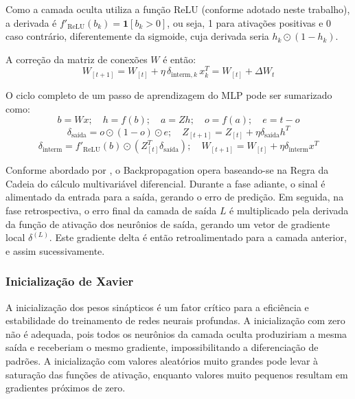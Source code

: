 Como a camada oculta utiliza a função ReLU (conforme adotado neste trabalho), a derivada é $f'_{\text{ReLU}}(b_k) = \mathbf{1}[b_k > 0]$, ou seja, 1 para ativações positivas e 0 caso contrário, diferentemente da sigmoide, cuja derivada seria $h_k \odot (1 - h_k)$.

A correção da matriz de conexões $W$ é então:
\begin{equation}
W_{[t+1]} = W_{[t]} + \eta \, \delta_{\text{interm},k} \, x_k^T = W_{[t]} + \Delta W_t
\end{equation}

O ciclo completo de um passo de aprendizagem do MLP pode ser sumarizado como:
\begin{equation}
b = Wx; \quad h = f(b); \quad a = Zh; \quad o = f(a); \quad e = t - o
\end{equation}
\begin{equation}
\delta_{\text{saída}} = o \odot (1-o) \odot e; \quad Z_{[t+1]} = Z_{[t]} + \eta \delta_{\text{saída}} h^T
\end{equation}
\begin{equation}
\delta_{\text{interm}} = f'_{\text{ReLU}}(b) \odot (Z_{[t]}^T \delta_{\text{saída}}); \quad W_{[t+1]} = W_{[t]} + \eta \delta_{\text{interm}} x^T
\end{equation}

Conforme abordado por , o Backpropagation opera baseando-se na Regra da Cadeia do cálculo multivariável diferencial. Durante a fase adiante, o sinal é alimentado da entrada para a saída, gerando o erro de predição. Em seguida, na fase retrospectiva, o erro final da camada de saída $L$ é multiplicado pela derivada da função de ativação dos neurônios de saída, gerando um vetor de gradiente local $\delta^{(L)}$. Este gradiente delta é então retroalimentado para a camada anterior, e assim sucessivamente.

\subsubsection{Inicialização de Xavier}

A inicialização dos pesos sinápticos é um fator crítico para a eficiência e estabilidade do treinamento de redes neurais profundas. A inicialização com zero não é adequada, pois todos os neurônios da camada oculta produziriam a mesma saída e receberiam o mesmo gradiente, impossibilitando a diferenciação de padrões. A inicialização com valores aleatórios muito grandes pode levar à saturação das funções de ativação, enquanto valores muito pequenos resultam em gradientes próximos de zero.


